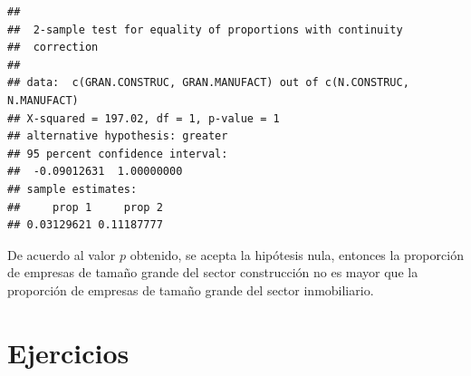 \documentclass[
]{krantz}
\begin{document}
\begin{verbatim}
## 
##  2-sample test for equality of proportions with continuity
##  correction
## 
## data:  c(GRAN.CONSTRUC, GRAN.MANUFACT) out of c(N.CONSTRUC, N.MANUFACT)
## X-squared = 197.02, df = 1, p-value = 1
## alternative hypothesis: greater
## 95 percent confidence interval:
##  -0.09012631  1.00000000
## sample estimates:
##     prop 1     prop 2 
## 0.03129621 0.11187777
\end{verbatim}

De acuerdo al valor \(p\) obtenido, se acepta la hipótesis nula, entonces la proporción de empresas de tamaño grande del sector construcción no es mayor que la proporción de empresas de tamaño grande del sector inmobiliario.

\newpage

\hypertarget{ejercicios-1}{%
\section{Ejercicios}\label{ejercicios-1}}
\end{document}
